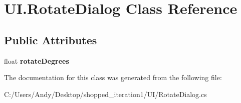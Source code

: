 \hypertarget{class_u_i_1_1_rotate_dialog}{
\section{UI.RotateDialog Class Reference}
\label{class_u_i_1_1_rotate_dialog}
}
\subsection*{Public Attributes}
\begin{DoxyCompactItemize}
\item 
\hypertarget{class_u_i_1_1_rotate_dialog_ad9a9797ec7230bcef671b13ff4d45864}{
float {\bfseries rotateDegrees}}
\label{class_u_i_1_1_rotate_dialog_ad9a9797ec7230bcef671b13ff4d45864}

\end{DoxyCompactItemize}


The documentation for this class was generated from the following file:\begin{DoxyCompactItemize}
\item 
C:/Users/Andy/Desktop/shopped\_\-iteration1/UI/RotateDialog.cs\end{DoxyCompactItemize}

